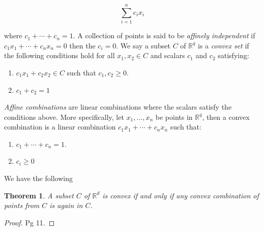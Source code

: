 \documentclass[oneside,12pt]{amsart}
\newtheorem{Theorem}{Theorem}[section]
\theoremstyle{definition}
\numberwithin{equation}{section}
\begin{document}
$$\sum_{i=1}^n c_ix_i$$

where $c_1 + \cdots + c_n = 1$.  A collection of points is said to be \textit{affinely independent} if $c_1x_1 + \cdots +c_nx_n = 0$ then the $c_i = 0$.  We say a subset $C$ of $\mathbb{R}^q$ is a \textit{convex set} if the following conditions hold for all $x_1, x_2 \in C$ and scalars $c_1$ and $c_2$ satisfying:

\begin{center}
\begin{enumerate}
  \item $c_1x_1 + c_2x_2 \in C$ such that $c_1, c_2 \geq 0$.\\
  \item $c_1 + c_2 = 1$
\end{enumerate}
\end{center}


\textit{Affine combinations} are linear combinations where the scalars satisfy the conditions above.  More specifically, let $x_1,\ldots,x_n$ be points in $\mathbb{R}^q$, then a convex combination is a linear combination $c_1x_1+ \cdots + c_nx_n$ such that:

\begin{center}
\begin{enumerate}
  \item $c_1 + \cdots + c_n =1$. \\
  \item $c_i \geq 0$
\end{enumerate}
\end{center}

We have the following

\begin{Theorem}
A subset $C$ of $\mathbb{R}^d$ is convex if and only if any convex combination of points from $C$ is again in $C$.
\end{Theorem}
\begin{proof}
\cite{B} Pg 11.
\end{proof}

\end{document}
